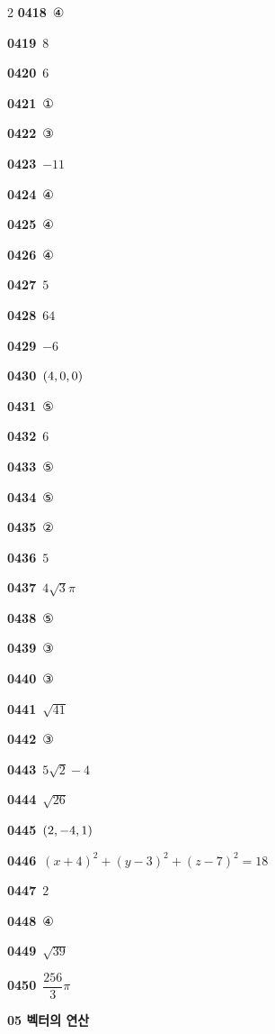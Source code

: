 \documentclass[10pt,a4paper]{article}
\begin{document}
\begin{multicols}{2}
\noindent\textbf{0418}\ ④\par
\noindent\textbf{0419}\ $8$\par
\noindent\textbf{0420}\ $6$\par
\noindent\textbf{0421}\ ①\par
\noindent\textbf{0422}\ ③\par
\noindent\textbf{0423}\ $-11$\par
\noindent\textbf{0424}\ ④\par
\noindent\textbf{0425}\ ④\par
\noindent\textbf{0426}\ ④\par
\noindent\textbf{0427}\ $5$\par
\noindent\textbf{0428}\ $64$\par
\noindent\textbf{0429}\ $-6$\par
\noindent\textbf{0430}\ $(4{,}\mkern3mu\mathopen{}0{,}\mkern3mu\mathopen{}0)$\par
\noindent\textbf{0431}\ ⑤\par
\noindent\textbf{0432}\ $6$\par
\noindent\textbf{0433}\ ⑤\par
\noindent\textbf{0434}\ ⑤\par
\noindent\textbf{0435}\ ②\par
\noindent\textbf{0436}\ $5$\par
\noindent\textbf{0437}\ $4\sqrt{3}\pi$\par
\noindent\textbf{0438}\ ⑤\par
\noindent\textbf{0439}\ ③\par
\noindent\textbf{0440}\ ③\par
\noindent\textbf{0441}\ $\sqrt{41}$\par
\noindent\textbf{0442}\ ③\par
\noindent\textbf{0443}\ $5\sqrt{2}-4$\par
\noindent\textbf{0444}\ $\sqrt{26}$\par
\noindent\textbf{0445}\ $(2{,}\mkern3mu\mathopen{}-4{,}\mkern3mu\mathopen{}1)$\par
\noindent\textbf{0446}\ $(x+4)^2+(y-3)^2+(z-7)^2=18$\par
\noindent\textbf{0447}\ $2$\par
\noindent\textbf{0448}\ ④\par
\noindent\textbf{0449}\ $\sqrt{39}$\par
\noindent\textbf{0450}\ $\dfrac{256}{3}\pi$\par
\noindent\textbf{05 벡터의 연산}\par\smallskip

\end{multicols}
\end{document}
